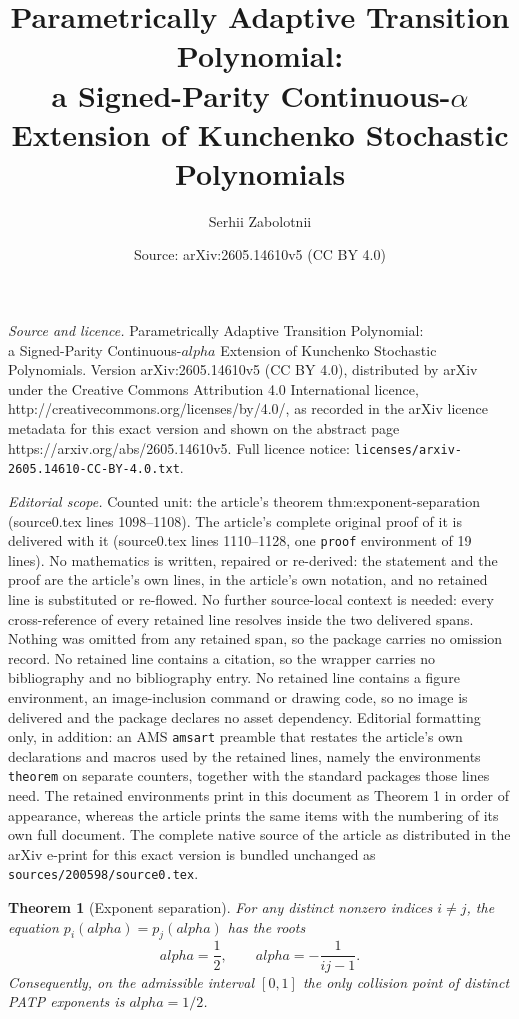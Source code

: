 \documentclass[10pt,a4paper]{amsart}
\title{Parametrically Adaptive Transition Polynomial:\\ a Signed-Parity Continuous-$\alpha$ Extension of Kunchenko Stochastic Polynomials}
\author{Serhii Zabolotnii}
\date{Source: arXiv:2605.14610v5 (CC BY 4.0)}
\newtheorem{theorem}{Theorem}
\def\alpha{alpha}%
\def\tfrac#1#2{#1/#2}%
\begin{document}
\maketitle

\noindent\emph{Source and licence.} Parametrically Adaptive Transition Polynomial:\\ a Signed-Parity Continuous-$\alpha$ Extension of Kunchenko Stochastic Polynomials. Version arXiv:2605.14610v5 (CC BY 4.0), distributed by arXiv under the Creative Commons Attribution 4.0 International licence, http://creativecommons.org/licenses/by/4.0/, as recorded in the arXiv licence metadata for this exact version and shown on the abstract page https://arxiv.org/abs/2605.14610v5. Full licence notice: \texttt{licenses/arxiv-2605.14610-CC-BY-4.0.txt}.\par\smallskip

\noindent\textit{Editorial scope.} Counted unit: the article's theorem thm:exponent-separation (source0.tex lines 1098--1108). The article's complete original proof of it is delivered with it (source0.tex lines 1110--1128, one \texttt{proof} environment of 19 lines). No mathematics is written, repaired or re-derived: the statement and the proof are the article's own lines, in the article's own notation, and no retained line is substituted or re-flowed.  No further source-local context is needed: every cross-reference of every retained line resolves inside the two delivered spans.  Nothing was omitted from any retained span, so the package carries no omission record.  No retained line contains a citation, so the wrapper carries no bibliography and no bibliography entry.  No retained line contains a figure environment, an image-inclusion command or drawing code, so no image is delivered and the package declares no asset dependency.  Editorial formatting only, in addition: an AMS \texttt{amsart} preamble that restates the article's own declarations and macros used by the retained lines, namely the environments \texttt{theorem} on separate counters, together with the standard packages those lines need.  The retained environments print in this document as Theorem 1 in order of appearance, whereas the article prints the same items with the numbering of its own full document.  The complete native source of the article as distributed in the arXiv e-print for this exact version is bundled unchanged as \texttt{sources/200598/source0.tex}.
\begin{theorem}[Exponent separation]\label{thm:exponent-separation}
For any distinct nonzero indices $i \neq j$, the equation
$p_i(\alpha)=p_j(\alpha)$ has the roots
\[
  \alpha=\frac{1}{2},
  \qquad
  \alpha=-\frac{1}{ij-1}.
\]
Consequently, on the admissible interval $[0,1]$ the only collision point of
distinct PATP exponents is $\alpha=\tfrac{1}{2}$.
\end{theorem}
\end{document}
